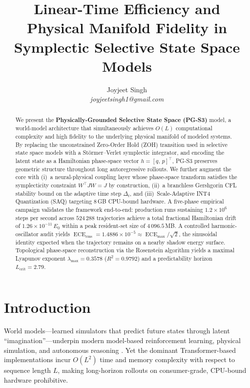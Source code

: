 \documentclass[10pt,twocolumn]{article}
\title{\vspace{-1.5em}\textbf{Linear-Time Efficiency and Physical Manifold
Fidelity in Symplectic Selective State Space Models}\vspace{-0.5em}}
\author{%
  Joyjeet Singh\\
  {\small \textit{joyjeetsingh1@gmail.com}}
}
\date{}
\DeclareMathOperator{\ECE}{ECE}
\begin{document}
\maketitle
\thispagestyle{empty}

\begin{abstract}
We present the \textbf{Physically-Grounded Selective State Space (PG-S3)}
model, a world-model architecture that simultaneously achieves
$O(L)$ computational complexity and high fidelity to the underlying physical
manifold of modeled systems.
By replacing the unconstrained Zero-Order Hold (ZOH) transition used in
selective state space models with a St\"{o}rmer--Verlet symplectic integrator, and
encoding the latent state as a Hamiltonian phase-space vector
$h = [q,\,p]^{\top}$, PG-S3 preserves geometric structure throughout
long autoregressive rollouts.
We further augment the core with (i)~a neural-physical coupling layer whose
phase-space transform satisfies the symplecticity constraint $W^{\top}JW=J$
by construction, (ii)~a branchless Gershgorin CFL stability bound
on the adaptive time step $\Delta_t$, and (iii)~Scale-Adaptive INT4
Quantization (SAQ) targeting 8\,GB CPU-bound hardware.
A five-phase empirical campaign validates the framework end-to-end:
production runs sustaining $1.2\times10^6$ steps per second across
$524\,288$ trajectories achieve a total fractional Hamiltonian drift of
$1.26\times10^{-11}\,E_0$ within a peak resident-set size of
$4\,096.5$\,MB.
A controlled harmonic-oscillator audit yields
$\ECE_{\mathrm{rms}}=1.4886\times10^{-5}\approx
\ECE_{\max}/\sqrt{2}$, the sinusoidal identity expected when the
trajectory remains on a nearby shadow energy surface.
Topological phase-space reconstruction via the Rosenstein algorithm yields a
maximal Lyapunov exponent $\lambda_{\max}=0.3578$ ($R^2=0.9792$) and a
predictability horizon $L_{\text{crit}}=2.79$.
\end{abstract}

\section{Introduction}
\label{sec:intro}

World models---learned simulators that predict future states through latent
``imagination''---underpin modern model-based reinforcement learning, physical
simulation, and autonomous reasoning \cite{hafner2019dream,lecun2022path}.
Yet the dominant Transformer-based implementations incur $O(L^2)$ time and
memory complexity with respect to sequence length $L$, making long-horizon
rollouts on consumer-grade, CPU-bound hardware prohibitive.
\end{document}
